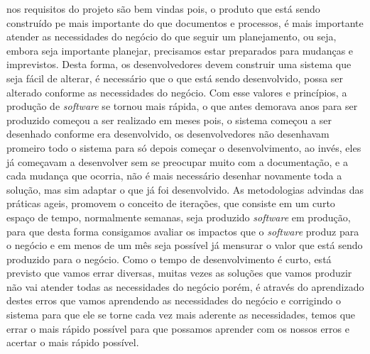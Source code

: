     nos requisitos do projeto são bem vindas pois, o produto que está sendo
    construído pe mais importante do que documentos e processos, é mais
    importante atender as necessidades do negócio do que seguir um planejamento,
    ou seja, embora seja importante planejar, precisamos estar preparados para
    mudanças e imprevistos. Desta forma, os desenvolvedores devem construir
    uma sistema que seja fácil de alterar, é necessário que o que está sendo
    desenvolvido, possa ser alterado conforme as necessidades do negócio. \newline
    Com esse valores e princípios, a produção de \textit{software} se tornou
    mais rápida, o que antes demorava anos para ser produzido começou a ser
    realizado em meses pois, o sistema começou a ser desenhado conforme era
    desenvolvido, os desenvolvedores não desenhavam promeiro todo o sistema
    para só depois começar o desenvolvimento, ao invés, eles já começavam a
    desenvolver sem se preocupar muito com a documentação, e a cada mudança
    que ocorria, não é mais necessário desenhar novamente toda a solução, mas
    sim adaptar o que já foi desenvolvido. \newline
    As metodologias advindas das práticas ageis, promovem o conceito de iterações,
    que consiste em um curto espaço de tempo, normalmente semanas, seja produzido
    \textit{software} em produção, para que desta forma consigamos avaliar os
    impactos que o \textit{software} produz para o negócio e em menos de um
    mês seja possível já mensurar o valor que está sendo produzido para o
    negócio. Como o tempo de desenvolvimento é curto, está previsto que vamos
    errar diversas, muitas vezes as soluções que vamos produzir não vai atender
    todas as necessidades do negócio porém, é através do aprendizado destes erros
    que vamos aprendendo as necessidades do negócio e corrigindo o sistema para
    que ele se torne cada vez mais aderente as necessidades, temos que errar o
    mais rápido possível para que possamos aprender com os nossos erros e acertar
    o mais rápido possível.

